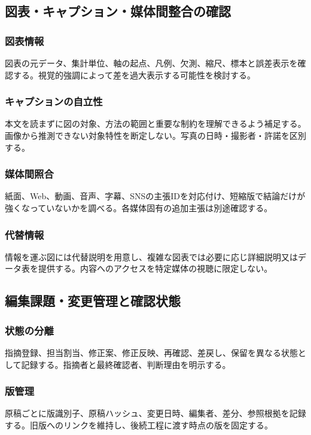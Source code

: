 \documentclass[a4paper,11pt]{article}
\begin{document}
\subsection{図表・キャプション・媒体間整合の確認}
\subsubsection{図表情報}
\par 図表の元データ、集計単位、軸の起点、凡例、欠測、縮尺、標本と誤差表示を確認する。視覚的強調によって差を過大表示する可能性を検討する。\par\medskip
\subsubsection{キャプションの自立性}
\par 本文を読まずに図の対象、方法の範囲と重要な制約を理解できるよう補足する。画像から推測できない対象特性を断定しない。写真の日時・撮影者・許諾を区別する。\par\medskip
\subsubsection{媒体間照合}
\par 紙面、Web、動画、音声、字幕、SNSの主張IDを対応付け、短縮版で結論だけが強くなっていないかを調べる。各媒体固有の追加主張は別途確認する。\par\medskip
\subsubsection{代替情報}
\par 情報を運ぶ図には代替説明を用意し、複雑な図表では必要に応じ詳細説明又はデータ表を提供する。内容へのアクセスを特定媒体の視聴に限定しない。\par\medskip
\subsection{編集課題・変更管理と確認状態}
\subsubsection{状態の分離}
\par 指摘登録、担当割当、修正案、修正反映、再確認、差戻し、保留を異なる状態として記録する。指摘者と最終確認者、判断理由を明示する。\par\medskip
\subsubsection{版管理}
\par 原稿ごとに版識別子、原稿ハッシュ、変更日時、編集者、差分、参照根拠を記録する。旧版へのリンクを維持し、後続工程に渡す時点の版を固定する。\par\medskip
\end{document}
